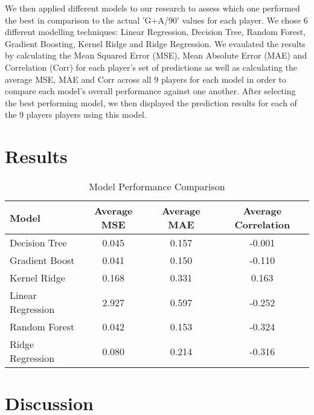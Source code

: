 \documentclass[12pt]{article}
\begin{document}
We then applied different models to our research to assess which one performed 
the best in comparison to the actual 'G+A/90' values for each player. We chose 
6 different modelling techniques:
Linear Regression, Decision Tree, Random Forest, Gradient Boosting, Kernel Ridge 
and Ridge Regression.
We evaulated the results by calculating the 
Mean Squared Error (MSE), Mean Absolute Error (MAE) and Correlation (Corr) for 
each player's set of predictions as well as calculating the average MSE, MAE and 
Corr across all 9 players for each model in order to compare each model's 
overall performance against one another.
After selecting the best performing model, we then displayed the prediction
results for each of the 9 players players using this model.





\section{Results}
\label{sec:resu}

\begin{table}[h]
  \centering
  \begin{tabular}{|l|c|c|c|}
  \hline
  \textbf{Model} & \textbf{Average MSE} & \textbf{Average MAE} & \textbf{Average Correlation} \\
  \hline
  Decision Tree & 0.045 & 0.157 & -0.001 \\
  Gradient Boost & 0.041 & 0.150 & -0.110 \\
  Kernel Ridge & 0.168 & 0.331 & 0.163 \\
  Linear Regression & 2.927 & 0.597 & -0.252 \\
  Random Forest & 0.042 & 0.153 & -0.324 \\
  Ridge Regression & 0.080 & 0.214 & -0.316 \\
  \hline
  \end{tabular}
  \caption{Model Performance Comparison}
  \label{tab:model_performance}
  \end{table}


\section{Discussion}
\label{sec:disc}












 
\end{document}
